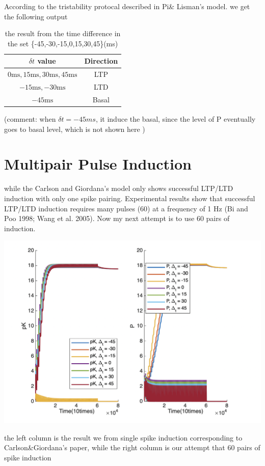 \documentclass{article}
\begin{document}
According to the tristability protocal described in Pi\& Lisman's model. we get the following output \begin{table}[h]
    \centering
    \begin{tabular}{|c|c|}
    \hline
    $\delta t$ value & Direction \\
    \hline
    $0\text{ms}, 15\text{ms}, 30\text{ms}, 45\text{ms}$ & LTP \\
    \hline
    $-15\text{ms}, -30\text{ms}$ & LTD \\
    \hline
    $-45\text{ms}$ & Basal \\
    \hline
    \end{tabular}
    \caption{the result from the time difference in the set \{-45,-30,-15,0,15,30,45\}(ms)}
    \label{table:delta_t}
\end{table}


(comment: when $\delta t=-45ms$, it induce the basal, since the level of P eventually goes to basal level, which is not shown here )
\section{Multipair Pulse Induction}
while the Carlson and Giordana's model only shows successful LTP/LTD induction with only one spike pairing. Experimental results show that successful LTP/LTD induction requires many pulses (60) at a frequency of 1 Hz (Bi and Poo 1998; Wang et al. 2005). Now my next attempt is to use 60 pairs of induction.
        \begin{center}
        \includegraphics[width=.5\textwidth]{222.png}
    \end{center}
the left column is the result we from single spike induction corresponding to Carlson\&Giordana's paper, while the right column is our attempt that 60 pairs of spike induction
\end{document}
